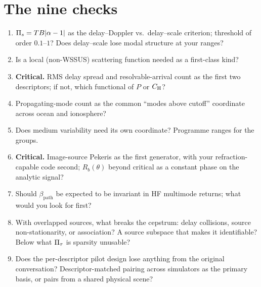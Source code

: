 \documentclass[10pt,a4paper]{article}
\begin{document}
\section*{The nine checks}
\begin{enumerate}[label=\textbf{\arabic*.},leftmargin=*,itemsep=0pt]
\item $\Pi_{s}=TB|\alpha-1|$ as the delay--Doppler vs.\ delay--scale criterion; threshold of order $0.1$--$1$? Does delay--scale lose modal structure at your ranges?
\item Is a local (non-WSSUS) scattering function needed as a first-class kind?
\item \textbf{Critical.} RMS delay spread and resolvable-arrival count as the first two descriptors; if not, which functional of $P$ or $C_{\mathrm{H}}$?
\item Propagating-mode count as the common ``modes above cutoff'' coordinate across ocean and ionosphere?
\item Does medium variability need its own coordinate? Programme ranges for the groups.
\item \textbf{Critical.} Image-source Pekeris as the first generator, with your refraction-capable code second; $R_b(\theta)$ beyond critical as a constant phase on the analytic signal?
\item Should $\beta_{\mathrm{path}}$ be expected to be invariant in HF multimode returns; what would you look for first?
\item With overlapped sources, what breaks the cepstrum: delay collisions, source non-stationarity, or association? A source subspace that makes it identifiable? Below what $\Pi_{\tau}$ is sparsity unusable?
\item Does the per-descriptor pilot design lose anything from the original conversation? Descriptor-matched pairing across simulators as the primary basis, or pairs from a shared physical scene?
\end{enumerate}

\vspace{-2pt}
{\footnotesize

}
\end{document}
